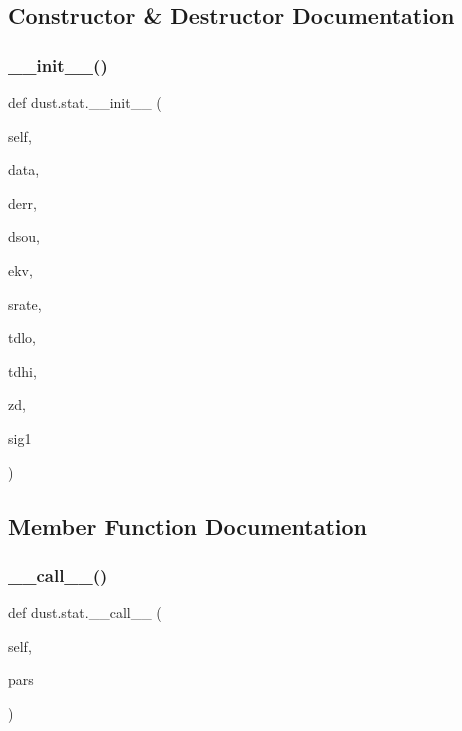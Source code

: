 \subsection{Constructor \& Destructor Documentation}
\mbox{\label{classdust_1_1stat_a9cad42985fd8e12c8cc4d9b7c7a60db1}} 
\subsubsection{\texorpdfstring{\+\_\+\+\_\+init\+\_\+\+\_\+()}{\_\_init\_\_()}}
{\footnotesize\ttfamily def dust.\+stat.\+\_\+\+\_\+init\+\_\+\+\_\+ (\begin{DoxyParamCaption}\item[{}]{self,  }\item[{}]{data,  }\item[{}]{derr,  }\item[{}]{dsou,  }\item[{}]{ekv,  }\item[{}]{srate,  }\item[{}]{tdlo,  }\item[{}]{tdhi,  }\item[{}]{zd,  }\item[{}]{sig1 }\end{DoxyParamCaption})}



\subsection{Member Function Documentation}
\mbox{\label{classdust_1_1stat_a418ad82302827896a76257e60d90bdc1}} 
\subsubsection{\texorpdfstring{\+\_\+\+\_\+call\+\_\+\+\_\+()}{\_\_call\_\_()}}
{\footnotesize\ttfamily def dust.\+stat.\+\_\+\+\_\+call\+\_\+\+\_\+ (\begin{DoxyParamCaption}\item[{}]{self,  }\item[{}]{pars }\end{DoxyParamCaption})}



